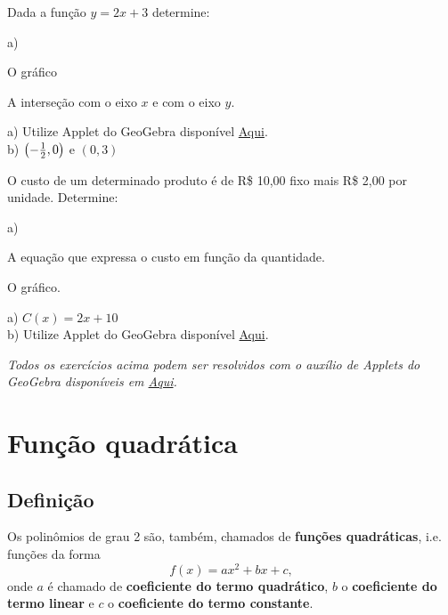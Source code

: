 \documentclass[../main.tex]{subfiles}
\begin{document}
\begin{exer}
  Dada a função $y = 2x + 3$ determine:
   \begin{opcexer}{a)}
  \item O gráfico
   \item A interseção com o eixo $x$ e com o eixo $y$.
\end{opcexer}
   \end{exer}
\begin{resp}
a) Utilize Applet do GeoGebra disponível \href{https://www.geogebra.org/m/c4mdexgd}{Aqui}.\\
b) $\left(-\frac{1}{2},0\right)$ e $(0,3)$
\end{resp}
\begin{exer}
  O custo de um determinado produto é de R\$ 10,00 fixo mais R\$ 2,00 por unidade. Determine:
   \begin{opcexer}{a)}
     \item A equação que expressa o custo em função da  quantidade.
       \item  O gráfico.
         \end{opcexer}
   \end{exer}
\begin{resp}
a) $C(x)=2x+10$\\
b) Utilize Applet do GeoGebra disponível \href{https://www.geogebra.org/m/c4mdexgd}{Aqui}.
\end{resp}
\begin{obs}
 \textit{ Todos os exercícios acima podem ser resolvidos com o auxílio de Applets do GeoGebra disponíveis em \href{https://www.geogebra.org/m/c4mdexgd}{Aqui}.}
\end{obs}

\section{Função quadrática}\label{sec:FuncQuadratica}
\subsection{Definição}
Os polinômios de grau 2 são, também, chamados de \textbf{funções quadráticas}, i.e. funções da forma
\begin{equation}
  f(x) = ax^2 + bx + c,\label{eq:FormCanFuncQuad}
\end{equation}
onde $a$ é chamado de \textbf{coeficiente do termo quadrático}, $b$ o \textbf{coeficiente do termo linear} e $c$ o \textbf{coeficiente do termo constante}.
\end{document}
